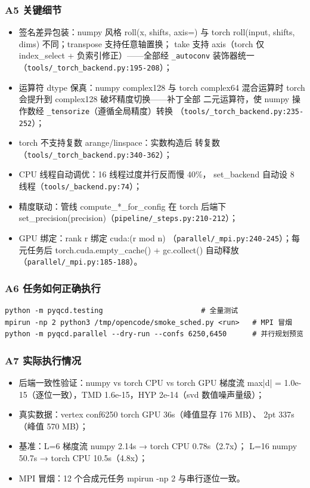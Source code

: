 \documentclass[UTF8]{ctexart}
\begin{document}
\subsubsection{A5 关键细节}
\begin{itemize}
\item \textcolor{struct}{签名差异包装}：numpy 风格 roll(x, shifts, axis=)
与 torch roll(input, shifts, dims) 不同；transpose 支持任意轴置换；
take 支持 axis（torch 仅 index\_select + 负索引修正）——全部经
\texttt{\nolinkurl{_autoconv}} 装饰器统一（\texttt{\nolinkurl{tools/_torch_backend.py:195-208}}）；
\item \textcolor{struct}{运算符 dtype 保真}：numpy complex128 与 torch
complex64 混合运算时 torch 会提升到 complex128 破坏精度切换——补丁全部
二元运算符，使 numpy 操作数经 \texttt{\nolinkurl{_tensorize}}（遵循全局精度）转换
（\texttt{\nolinkurl{tools/_torch_backend.py:235-252}}）；
\item \textcolor{struct}{torch 不支持复数 arange/linspace}：实数构造后
转复数（\texttt{\nolinkurl{tools/_torch_backend.py:340-362}}）；
\item \textcolor{struct}{CPU 线程自动调优}：16 线程过度并行反而慢 40\%，
set\_backend 自动设 8 线程（\texttt{\nolinkurl{tools/_backend.py:74}}）；
\item \textcolor{struct}{精度联动}：管线 compute\_*\_for\_config 在 torch
后端下 set\_precision(precision)（\texttt{\nolinkurl{pipeline/_steps.py:210-212}}）；
\item \textcolor{struct}{GPU 绑定}：rank r 绑定 cuda:(r mod n)
（\texttt{\nolinkurl{parallel/_mpi.py:240-245}}）；每元任务后
torch.cuda.empty\_cache() + gc.collect() 自动释放
（\texttt{\nolinkurl{parallel/_mpi.py:185-188}}）。
\end{itemize}

\subsubsection{A6 任务如何正确执行}
\begin{verbatim}
python -m pyqcd.testing                       # 全量测试
mpirun -np 2 python3 /tmp/opencode/smoke_sched.py <run>   # MPI 冒烟
python -m pyqcd.parallel --dry-run --confs 6250,6450      # 并行规划预览
\end{verbatim}

\subsubsection{A7 实际执行情况}
\begin{itemize}
\item 后端一致性验证：numpy vs torch CPU vs torch GPU 梯度流 max|d| =
1.0e-15（逐位一致），TMD 1.6e-15，HYP 2e-14（svd 数值噪声量级）；
\item 真实数据：vertex conf6250 torch GPU 36s（峰值显存 176 MB）、
2pt 337s（峰值 570 MB）；
\item 基准：L=6 梯度流 numpy 2.14s → torch CPU 0.78s（2.7x）；
L=16 numpy 50.7s → torch CPU 10.5s（4.8x）；
\item MPI 冒烟：12 个合成元任务 mpirun -np 2 与串行逐位一致。
\end{itemize}
\end{document}
